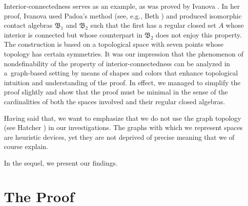 \documentclass[a4paper,12pt]{amsart}
\numberwithin{equation}{section}
\theoremstyle{mytheoremstyle}
\begin{document}
Interior-connectedness serves as an example, as was proved by Ivanova
\cite[Proposition~2.1]{Ivanova-ECAATC}. In her proof, Ivanova used Padoa's
method (see, e.g., Beth \cite{Beth-OPMITTOF}) and produced isomorphic contact
algebras $\mathfrak{B}_{1}$ and $\mathfrak{B}_{2}$ such that the first
has a regular closed set $A$ whose interior is connected but whose counterpart
in $\mathfrak{B}_{2}$ does not enjoy this property. The construction is
based on a topological space with seven points whose topology has certain
symmetries. It was our impression that the phenomenon of nondefinability
of the property of interior-connectedness can be analyzed in a~graph-based
setting by means of shapes and colors that enhance topological intuition
and understanding of the proof. In effect, we managed to simplify the proof
slightly and show that the proof must be minimal in the sense of the cardinalities
of both the spaces involved and their regular closed algebras.

Having said that, we want to emphasize that we do not use the graph topology
(see Hatcher \cite{Hatcher-AT}) in our investigations. The graphs with which
we represent spaces are heuristic devices, yet they are not deprived of
precise meaning that we of course explain.

In the sequel, we present our findings.

\section{The Proof}
\label{sec2}
\end{document}
